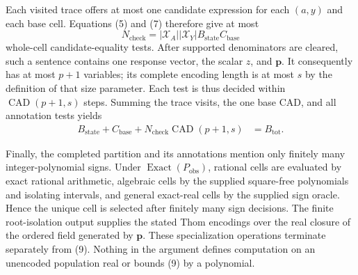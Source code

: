 Each visited trace offers at most one candidate expression for each \((a,y)\) and each base cell.  Equations (5) and (7) therefore give at most
\[
N_{\mathrm{check}}
=|\mathcal X_A||\mathcal X_Y|B_{\mathrm{state}}C_{\mathrm{base}}
\tag{8}
\]
whole-cell candidate-equality tests.  After supported denominators are cleared, such a sentence contains one response vector, the scalar \(z\), and \(\mathbf p\).  It consequently has at most \(p+1\) variables; its complete encoding length is at most \(s\) by the definition of that size parameter.  Each test is thus decided within \(\operatorname{CAD}(p+1,s)\) steps.  Summing the trace visits, the one base CAD, and all annotation tests yields
\[
\begin{aligned}
B_{\mathrm{state}}+C_{\mathrm{base}}
+N_{\mathrm{check}}\operatorname{CAD}(p+1,s)
&=B_{\mathrm{tot}}.
\end{aligned}
\tag{9}
\]

Finally, the completed partition and its annotations mention only finitely many integer-polynomial signs.  Under \(\operatorname{Exact}(P_{\mathrm{obs}})\), rational cells are evaluated by exact rational arithmetic, algebraic cells by the supplied square-free polynomials and isolating intervals, and general exact-real cells by the supplied sign oracle.  Hence the unique cell is selected after finitely many sign decisions.  The finite root-isolation output supplies the stated Thom encodings over the real closure of the ordered field generated by \(\mathbf p\).  These specialization operations terminate separately from (9).  Nothing in the argument defines computation on an unencoded population real or bounds (9) by a polynomial.